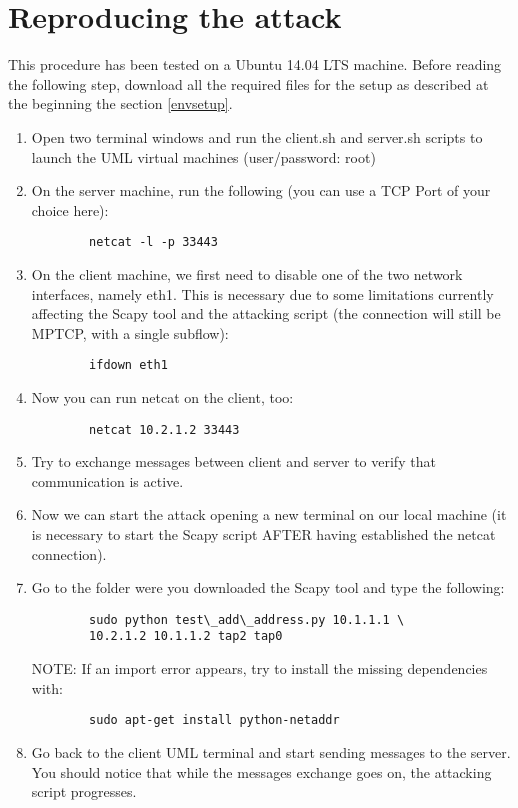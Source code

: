 \section{Reproducing the attack}
\label{reprattack}
This procedure has been tested on a Ubuntu 14.04 LTS machine. Before reading the following step, download all the required files for the setup as described at the beginning the section \ref{envsetup}.

\begin{enumerate}
\item
    Open two terminal windows and run the client.sh and server.sh scripts to launch the UML virtual machines (user/password: root)
\item
    On the server machine, run the following (you can use a TCP Port of your choice here):
\begin{verbatim}
        netcat -l -p 33443
\end{verbatim}
\item
    On the client machine, we first need to disable one of the two network interfaces, namely eth1. This is necessary due to some limitations currently affecting the Scapy tool and the attacking script (the connection will still be MPTCP, with a single subflow):
\begin{verbatim}
        ifdown eth1
\end{verbatim}
\item
    Now you can run netcat on the client, too:
\begin{verbatim}
        netcat 10.2.1.2 33443
\end{verbatim}
\item
    Try to exchange messages between client and server to verify that communication is active.
\item
    Now we can start the attack opening a new terminal on our local machine (it is necessary to start the Scapy script AFTER having established the netcat connection).
\item
    Go to the folder were you downloaded the Scapy tool and type the following:
\begin{verbatim}
        sudo python test\_add\_address.py 10.1.1.1 \
        10.2.1.2 10.1.1.2 tap2 tap0
\end{verbatim}

    NOTE: If an import error appears, try to install the missing dependencies with:
\begin{verbatim}
        sudo apt-get install python-netaddr
\end{verbatim}
\item
    Go back to the client UML terminal and start sending messages to the server. You should notice that while the messages exchange goes on, the attacking script progresses. 
    

\end{enumerate}
